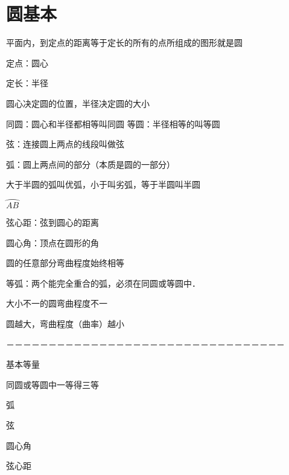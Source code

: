 


\section{圆基本}

平面内，到定点的距离等于定长的所有的点所组成的图形就是圆

定点：圆心

定长：半径

圆心决定圆的位置，半径决定圆的大小

同圆：圆心和半径都相等叫同圆
等圆：半径相等的叫等圆

弦：连接圆上两点的线段叫做弦

弧：圆上两点间的部分（本质是圆的一部分）

大于半圆的弧叫优弧，小于叫劣弧，等于半圆叫半圆

$\wideparen{AB}$

弦心距：弦到圆心的距离

圆心角：顶点在圆形的角

圆的任意部分弯曲程度始终相等

等弧：两个能完全重合的弧，必须在同圆或等圆中．

大小不一的圆弯曲程度不一

圆越大，弯曲程度（曲率）越小





－－－－－－－－－－－－－－－－－－－－－－－－－－－－－－－－－




基本等量


同圆或等圆中一等得三等

弧

弦

圆心角

弦心距

